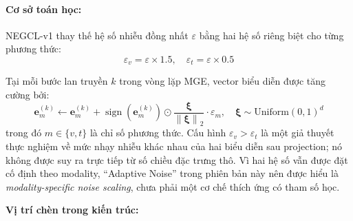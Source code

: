\paragraph{Cơ sở toán học:}
NEGCL-v1 thay thế hệ số nhiễu đồng nhất $\varepsilon$ bằng hai hệ số riêng biệt cho từng phương thức:
\begin{equation}
\varepsilon_v = \varepsilon \times 1.5, \quad \varepsilon_t = \varepsilon \times 0.5
\end{equation}

Tại mỗi bước lan truyền $k$ trong vòng lặp MGE, vector biểu diễn được tăng cường bởi:
\begin{equation}
\mathbf{e}^{(k)}_{m} \leftarrow \mathbf{e}^{(k)}_{m} + \operatorname{sign}\!\left(\mathbf{e}^{(k)}_{m}\right) \odot \frac{\boldsymbol{\xi}}{\left\|\boldsymbol{\xi}\right\|_2} \cdot \varepsilon_m, \quad \boldsymbol{\xi} \sim \mathrm{Uniform}(0,1)^{d}
\end{equation}
trong đó $m \in \{v,t\}$ là chỉ số phương thức. Cấu hình $\varepsilon_v > \varepsilon_t$ là một giả thuyết thực nghiệm về mức nhạy nhiễu khác nhau của hai biểu diễn sau projection; nó không được suy ra trực tiếp từ số chiều đặc trưng thô. Vì hai hệ số vẫn được đặt cố định theo modality, ``Adaptive Noise'' trong phiên bản này nên được hiểu là \textit{modality-specific noise scaling}, chưa phải một cơ chế thích ứng có tham số học.

\par\medskip
\noindent\textbf{Vị trí chèn trong kiến trúc:}\par
\nopagebreak[4]

